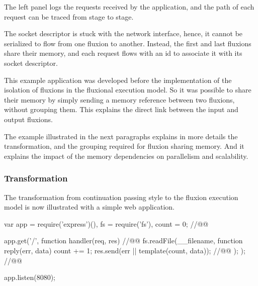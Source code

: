 The left panel logs the requests received by the application, and the path of each request can be traced from stage to stage.

The socket descriptor is stuck with the network interface, hence, it cannot be serialized to flow from one fluxion to another.
Instead, the first and last fluxions share their memory, and each request flows with an id to associate it with its socket descriptor.

This example application was developed before the implementation of the isolation of fluxions in the fluxional execution model.
So it was possible to share their memory by simply sending a memory reference between two fluxions, without grouping them.
This explains the direct link between the input and output fluxions.

The example illustrated in the next paragraphs explains in more details the transformation, and the grouping required for fluxion sharing memory.
And it explains the impact of the memory dependencies on parallelism and scalability.

\subsubsection{Transformation}

The transformation from continuation passing style to the fluxion execution model is now illustrated with a simple web application.

\begin{code}[js,
  caption={Example web application},
  label={lst:source}]
var app = require('express')(),
    fs = require('fs'),
    count = 0; //@\label{lst:source-counter}@

app.get('/', function handler(req, res){ //@\label{lst:source-handler}@
  fs.readFile(__filename, function reply(err, data) {
    count += 1;
    res.send(err || template(count, data)); //@\label{lst:source-send}@
  });
}); //@\label{lst:source-handler-end}@

app.listen(8080);
\end{code}



